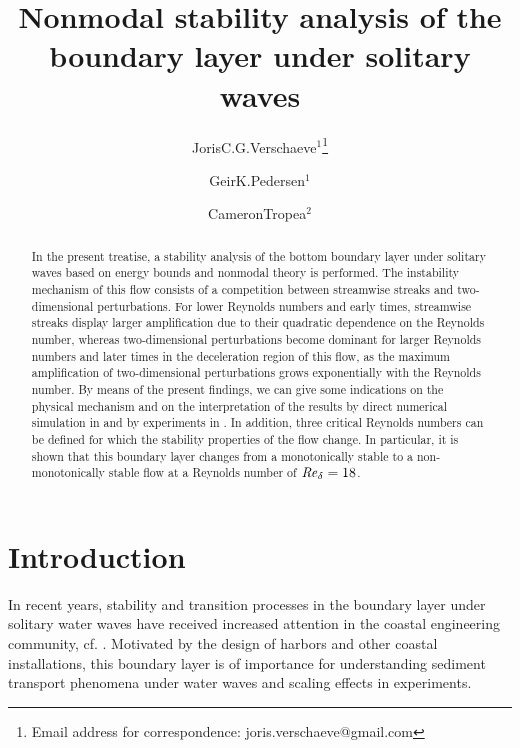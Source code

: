 \documentclass{jfm}
\title[Nonmodal stability analysis of the boundary layer under solitary waves]{
Nonmodal stability analysis of the boundary layer under solitary waves}
\author[J. C. G. Verschaeve {\em et al.}]%
{Joris\ls C.\ls G.\ls Verschaeve$^1$\thanks{Email address for correspondence: joris.verschaeve@gmail.com}
\and \ls
Geir\ls K.\ls Pedersen$^1$ \and \ls Cameron\ls Tropea$^2$}
\affiliation{$^1$University of Oslo, Po.Box 1072 Blindern, 0316 Oslo, Norway\\
$^2$Technische Universit\"at Darmstadt, 64347 Griesheim, Germany}
\newcommand\Rey{\mbox{\textit{Re}}}  %
\begin{document}
\maketitle

\begin{abstract}
  In the present treatise, a stability analysis
  of the bottom boundary layer under solitary waves
based on energy bounds and nonmodal theory is
performed. The instability mechanism 
of this flow consists of a competition
between streamwise streaks
and two-dimensional perturbations. For
lower Reynolds numbers and early times,
streamwise streaks display larger 
amplification due to their quadratic dependence
on the Reynolds number, whereas two-dimensional
perturbations become dominant for larger 
Reynolds numbers and later times in the deceleration
region of this flow, as the maximum amplification
of two-dimensional perturbations grows exponentially
with the Reynolds number. By means of the present
findings, we can give some indications on the physical
mechanism and on the interpretation of
the results by direct numerical simulation
in \citep{VittoriBlondeaux2008,OzdemirHsuBalachandar2013}
and by experiments in \citep{SumerJensenSorensenFredsoeLiuCarstensen2010}.
In addition, three critical
Reynolds numbers can be defined for which 
the stability properties of the flow change. 
In particular, it is shown that this 
boundary layer changes from
a monotonically stable to a non-monotonically stable
flow at a Reynolds number of $ \Rey_\delta = 18$. 
\end{abstract}

\section{Introduction}

In recent years,
stability and transition processes in the
boundary layer under solitary water waves have received
increased attention in the coastal engineering community,
cf. 
\citep{LiuParkCowen2007,VittoriBlondeaux2008,SumerJensenSorensenFredsoeLiuCarstensen2010,OzdemirHsuBalachandar2013,VerschaevePedersen2014}.
Motivated by the design of
harbors and other coastal installations, this boundary layer is of 
importance for understanding sediment transport phenomena
under water waves and scaling effects in experiments. 
\end{document}
